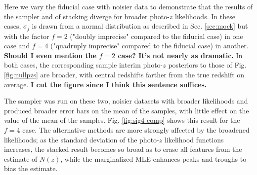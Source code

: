 \documentclass[preprint]{aastex}
\begin{document}
Here we vary the fiducial case with noisier data to demonstrate that the 
results of the sampler and of stacking diverge for broader photo-$z$ 
likelihoods.  In these cases, $\sigma_{j}$ is drawn from a normal distribution 
as described in Sec. \ref{sec:mock} but with the factor $f=2$ ("doubly 
imprecise" compared to the fiducial case) in one case and $f=4$ ("quadruply 
imprecise" compared to the fiducial case) in another.  \textbf{Should I even 
mention the $f=2$ case?  It's not nearly as dramatic.}  In both cases, the 
corresponding sample interim photo-$z$ posteriors to those of Fig. 
\ref{fig:nullpzs} are broader, with central redshifts farther from the true 
redshift on average.  \textbf{I cut the figure since I think this sentence 
suffices.}

%

The sampler was run on these two, noisier datasets with broader likelihoods and 
produced broader error bars on the mean of the samples, with little effect on 
the value of the mean of the samples.  Fig. \ref{fig:sig4-comp} shows this 
result for the $f=4$ case.  The alternative methods are more strongly affected 
by the broadened likelihoods; as the standard deviation of the photo-$z$ 
likelihood functions increases, the stacked result becomes so broad as to erase 
all features from the estimate of $N(z)$, while the marginalized MLE enhances 
peaks and troughs to bias the estimate.
\end{document}
